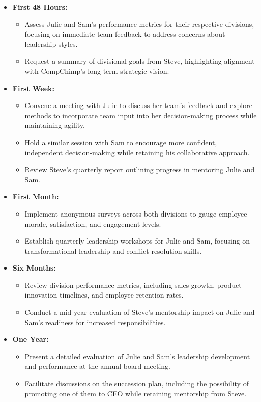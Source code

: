 \documentclass[a4paper,10pt]{article}
\begin{document}
\begin{itemize}
    \item \textbf{First 48 Hours:}
    \begin{itemize}
        \item Assess Julie and Sam's performance metrics for their respective divisions, focusing on immediate team feedback to address concerns about leadership styles.
        \item Request a summary of divisional goals from Steve, highlighting alignment with CompChimp's long-term strategic vision.
    \end{itemize}
    \item \textbf{First Week:}
    \begin{itemize}
        \item Convene a meeting with Julie to discuss her team's feedback and explore methods to incorporate team input into her decision-making process while maintaining agility.
        \item Hold a similar session with Sam to encourage more confident, independent decision-making while retaining his collaborative approach.
        \item Review Steve’s quarterly report outlining progress in mentoring Julie and Sam.
    \end{itemize}
    \item \textbf{First Month:}
    \begin{itemize}
        \item Implement anonymous surveys across both divisions to gauge employee morale, satisfaction, and engagement levels.
        \item Establish quarterly leadership workshops for Julie and Sam, focusing on transformational leadership and conflict resolution skills.
    \end{itemize}
    \item \textbf{Six Months:}
    \begin{itemize}
        \item Review division performance metrics, including sales growth, product innovation timelines, and employee retention rates.
        \item Conduct a mid-year evaluation of Steve’s mentorship impact on Julie and Sam’s readiness for increased responsibilities.
    \end{itemize}
    \item \textbf{One Year:}
    \begin{itemize}
        \item Present a detailed evaluation of Julie and Sam’s leadership development and performance at the annual board meeting.
        \item Facilitate discussions on the succession plan, including the possibility of promoting one of them to CEO while retaining mentorship from Steve.
    \end{itemize}
\end{itemize}
\end{document}
